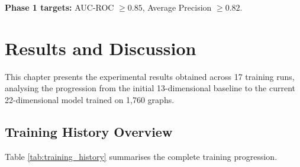 \documentclass[12pt]{report}
\begin{document}
\textbf{Phase 1 targets:} AUC-ROC $\geq 0.85$, Average Precision $\geq 0.82$.

\newpage

\chapter{Results and Discussion}

This chapter presents the experimental results obtained across 17 training runs, analysing the progression from the initial 13-dimensional baseline to the current 22-dimensional model trained on 1,760 graphs.

\section{Training History Overview}

Table \ref{tab:training_history} summarises the complete training progression.
\end{document}
